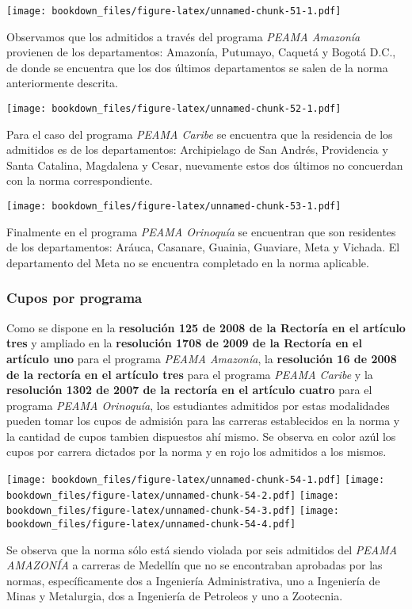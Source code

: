 \documentclass[]{article}
\theoremstyle{definition}
\theoremstyle{definition}
\theoremstyle{definition}
\theoremstyle{remark}
\begin{document}
\texttt{[image: bookdown\_files/figure-latex/unnamed-chunk-51-1.pdf]}

Observamos que los admitidos a través del programa \emph{PEAMA Amazonía}
provienen de los departamentos: Amazonía, Putumayo, Caquetá y Bogotá
D.C., de donde se encuentra que los dos últimos departamentos se salen
de la norma anteriormente descrita.

\texttt{[image: bookdown\_files/figure-latex/unnamed-chunk-52-1.pdf]}

Para el caso del programa \emph{PEAMA Caribe} se encuentra que la
residencia de los admitidos es de los departamentos: Archipielago de San
Andrés, Providencia y Santa Catalina, Magdalena y Cesar, nuevamente
estos dos últimos no concuerdan con la norma correspondiente.

\texttt{[image: bookdown\_files/figure-latex/unnamed-chunk-53-1.pdf]}

Finalmente en el programa \emph{PEAMA Orinoquía} se encuentran que son
residentes de los departamentos: Aráuca, Casanare, Guainia, Guaviare,
Meta y Vichada. El departamento del Meta no se encuentra completado en
la norma aplicable.

\subsubsection{Cupos por programa}\label{cupos-por-programa}

Como se dispone en la \textbf{resolución 125 de 2008 de la Rectoría en
el artículo tres} y ampliado en la \textbf{resolución 1708 de 2009 de la
Rectoría en el artículo uno} para el programa \emph{PEAMA Amazonía}, la
\textbf{resolución 16 de 2008 de la rectoría en el artículo tres} para
el programa \emph{PEAMA Caribe} y la \textbf{resolución 1302 de 2007 de
la rectoría en el artículo cuatro} para el programa \emph{PEAMA
Orinoquía}, los estudiantes admitidos por estas modalidades pueden tomar
los cupos de admisión para las carreras establecidos en la norma y la
cantidad de cupos tambien dispuestos ahí mismo. Se observa en color azúl
los cupos por carrera dictados por la norma y en rojo los admitidos a
los mismos.

\texttt{[image: bookdown\_files/figure-latex/unnamed-chunk-54-1.pdf]}
\texttt{[image: bookdown\_files/figure-latex/unnamed-chunk-54-2.pdf]}
\texttt{[image: bookdown\_files/figure-latex/unnamed-chunk-54-3.pdf]}
\texttt{[image: bookdown\_files/figure-latex/unnamed-chunk-54-4.pdf]}

Se observa que la norma sólo está siendo violada por seis admitidos del
\emph{PEAMA AMAZONÍA} a carreras de Medellín que no se encontraban
aprobadas por las normas, específicamente dos a Ingeniería
Administrativa, uno a Ingeniería de Minas y Metalurgia, dos a Ingeniería
de Petroleos y uno a Zootecnia.
\end{document}
